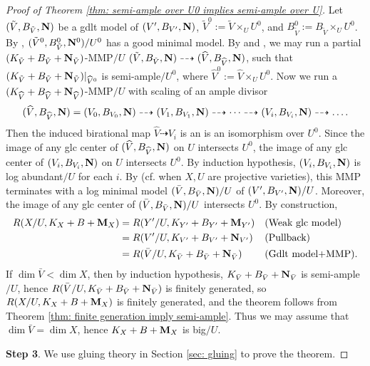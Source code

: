 \documentclass[11pt]{amsart}
\numberwithin{equation}{section}
\newcommand{\Mm}{{\bf{M}}}
\newcommand{\NN}{{\bf{N}}}
\theoremstyle{definition}
\theoremstyle{definition}
\theoremstyle{definition}
\begin{document}
\begin{proof}[Proof of Theorem \ref{thm: semi-ample over U0 implies
  semi-ample over U}]
  Let $(\tilde{V},B_{\tilde{V}},\NN)$ be a gdlt model of
  $(V',B_{V'},\NN)$, $\tilde{V}^0:=\tilde{V}\times_UU^0$, and
  $B^0_{\tilde V}:=B_{\tilde V}\times_UU^0$. By \cite[Theorem
  3.14]{HL21a}, $(\tilde V^0,B^0_{\tilde V},\NN^0)/U^0$ has a good
  minimal model. By \cite[Lemma 2.7]{LX22} and \cite[Lemmas
  3.9]{HL21a}, we may run a partial $(K_{\tilde V}+B_{\tilde
  V}+\NN_{\tilde V})$-MMP$/U$ $(\tilde V,B_{\tilde
  V},\NN)\dashrightarrow (\widehat V,B_{\widehat V},\NN)$, such that
  $(K_{\tilde V}+B_{\tilde V}+\NN_{\tilde V})|_{\widehat V^0}$ is
  semi-ample$/U^0$, where $\widehat V^0:=\widehat V\times_UU^0$. Now
  we run a $(K_{\widehat V}+B_{\widehat V}+\NN_{\widehat V})$-MMP$/U$
  with scaling of an ample divisor
  $$(\widehat V,B_{\widehat V},\NN)=(V_0,B_{V_0},\NN)\dashrightarrow
  (V_1,B_{V_1},\NN)\dashrightarrow\dots\dashrightarrow
  (V_i,B_{V_i},\NN)\dashrightarrow\dots.$$
  Then the induced birational map $\widehat V\dashrightarrow V_i$ is
  an is an isomorphism over $U^0$. Since the image of any glc center
  of $(\widehat V,B_{\widehat V},\NN)$ on $U$ intersects $U^0$, the
  image of any glc center of $(V_i,B_{V_i},\NN)$ on $U$ intersects
  $U^0$. By induction hypothesis, $(V_i,B_{V_i},\NN)$ is log
  abundant$/U$ for each $i$. By \cite[Theorem 7.6]{LX22} (cf.
  \cite[Theorem 3.15]{Has22} when $X,U$ are projective varieties),
  this MMP terminates with a log minimal model $(\bar V,B_{\bar
  V},\NN)/U$ of $(V',B_{V'},\NN)/U$. Moreover, the image of any glc
  center of  $(\bar V,B_{\bar V},\NN)/U$ intersects $U^0$. By construction,
  \begin{align*}
    R(X/U,K_X+B+\Mm_X)&=R(Y'/U,K_{Y'}+B_{Y'}+\Mm_{Y'}) && \text{(Weak
    glc model)}\\
    &=R(V'/U,K_{V'}+B_{V'}+\NN_{V'}) && \text{(Pullback)}\\
    &=R(\bar{V}/U,K_{\bar{V}}+B_{\bar{V}}+\NN_{\bar{V}}) &&
    (\text{Gdlt model+MMP}).
  \end{align*}
  If $\dim \bar V<\dim X$, then by induction hypothesis,
  $K_{\bar{V}}+B_{\bar{V}}+\NN_{\bar{V}}$ is semi-ample$/U$, hence
  $R(\bar{V}/U,K_{\bar{V}}+B_{\bar{V}}+\NN_{\bar{V}})$ is finitely
  generated, so $R(X/U,K_X+B+\Mm_X)$ is finitely generated, and the
  theorem follows from Theorem \ref{thm: finite generation imply
  semi-ample}. Thus we may assume that $\dim \bar V=\dim X$, hence
  $K_X+B+\Mm_X$ is big$/U$.

  \medskip

  \noindent\textbf{Step 3}. We use gluing theory in Section \ref{sec:
  gluing} to prove the theorem.


\end{proof}
\end{document}
